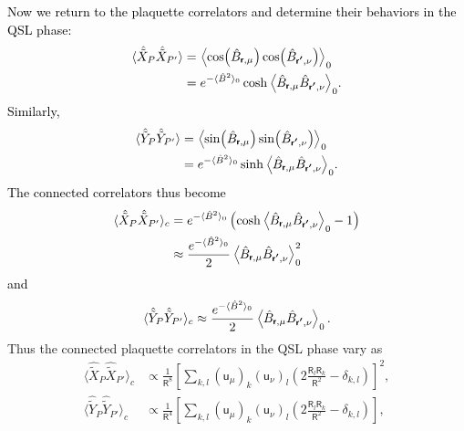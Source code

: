 \documentclass[twocolumn,superscriptaddress,amsmath,amssymb,aps,prx,nofootinbib]{revtex4-2}
\newcommand{\dual}[1]{\boldsymbol{\mathsf{#1}}}
\newcommand{\newtext}[1]{\textcolor{black}{#1}}
\begin{document}
\newtext{Now we return to the plaquette correlators and determine their behaviors in the QSL phase:
\begin{equation}
\begin{aligned}
    \langle \hat{\tilde{X}}_P \hat{\tilde{X}}_{P'} \rangle & = \expval{ \cos(\hat{B}_{\dual{r},\mu}) \cos(\hat{B}_{\dual{r'},\nu}) }_0\\
    & = e^{-\langle \hat{B}^2\rangle_0} \cosh{ \expval{\hat{B}_{\dual{r},\mu} \hat{B}_{\dual{r'},\nu}} _0 }.
\end{aligned}
\end{equation}
Similarly,
\begin{equation}
\begin{aligned}
    \langle \hat{\tilde{Y}}_P \hat{\tilde{Y}}_{P'} \rangle & = \expval{ \sin(\hat{B}_{\dual{r},\mu}) \sin(\hat{B}_{\dual{r'},\nu}) }_0\\
    & = e^{-\langle \hat{B}^2\rangle_0} \sinh{ \expval{\hat{B}_{\dual{r},\mu} \hat{B}_{\dual{r'},\nu}} _0 }.
\end{aligned}
\end{equation}
The connected correlators thus become
\begin{equation}
\begin{aligned}
    \langle \hat{\tilde{X}}_P \hat{\tilde{X}}_{P'} \rangle_c &= e^{-\langle \hat{B}^2\rangle_0} \left( \cosh{ \expval{\hat{B}_{\dual{r},\mu} \hat{B}_{\dual{r'},\nu}} _0 } - 1\right)\\
    & \approx \frac{e^{-\langle \hat{B}^2\rangle_0}}{2}   \expval{\hat{B}_{\dual{r},\mu} \hat{B}_{\dual{r'},\nu}}_0^2  
\end{aligned}
\end{equation}
and 
\begin{equation}
    \langle \hat{\tilde{Y}}_P \hat{\tilde{Y}}_{P'} \rangle_c  \approx \frac{e^{-\langle \hat{B}^2\rangle_0}}{2}   \expval{\hat{B}_{\dual{r},\mu} \hat{B}_{\dual{r'},\nu}}_0.  
\end{equation}
}
Thus the connected plaquette correlators in the QSL phase vary as
\begin{equation}\label{eq:correlator_theoretical}
  \begin{aligned}
    \langle \hat{\tilde{X}}_P \hat{\tilde{X}}_{P'} \rangle_c & \propto \frac{1}{\mathsf{R}^8} \left[ \sum_{k,l  } ( \dual{u}_\mu )_k ( \dual{u}_\nu )_l  \left(  2 \frac{\mathsf{R}_l \mathsf{R}_k}{\mathsf{R}^2} -  \delta_{k,l} \right) \right]^2 ,\\
    \langle \hat{\tilde{Y}}_P \hat{\tilde{Y}}_{P'} \rangle_c &  \propto \frac{1}{\mathsf{R}^4} \left[ \sum_{k,l  } ( \dual{u}_\mu )_k ( \dual{u}_\nu )_l  \left(  2 \frac{\mathsf{R}_l \mathsf{R}_k}{\mathsf{R}^2} -  \delta_{k,l} \right) \right],
\end{aligned}
\end{equation}
\end{document}

